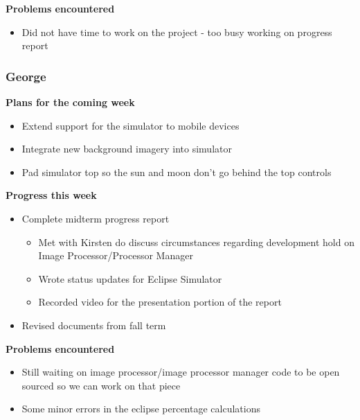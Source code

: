 \documentclass[10pt, onecolumn, draftclsnofoot, letterpaper, compsoc]{IEEEtran}
\begin{document}
    \noindent \textbf{Problems encountered}

    \begin{itemize}

    \item Did not have time to work on the project - too busy working on progress report

    \end{itemize}

    \subsubsection{George}

    \noindent \textbf{Plans for the coming week}

    \begin{itemize}

    \item Extend support for the simulator to mobile devices
    \item Integrate new background imagery into simulator
    \item Pad simulator top so the sun and moon don't go behind the top controls

    \end{itemize}

    \noindent \textbf{Progress this week}

    \begin{itemize}

    \item Complete midterm progress report

    \begin{itemize}
      \item Met with Kirsten do discuss circumstances regarding development hold on Image Processor/Processor Manager
      \item Wrote status updates for Eclipse Simulator
      \item Recorded video for the presentation portion of the report
      \end{itemize}

    \item Revised documents from fall term

    \end{itemize}

    \noindent \textbf{Problems encountered}

    \begin{itemize}

    \item Still waiting on image processor/image processor manager code to be open sourced so we can work on that piece
    \item Some minor errors in the eclipse percentage calculations

    \end{itemize}
\end{document}
